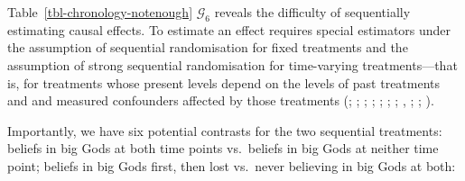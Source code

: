 \documentclass[
  single column]{article}
\begin{document}
Table~\ref{tbl-chronology-notenough} \(\mathcal{G}_6\) reveals the
difficulty of sequentially estimating causal effects. To estimate an
effect requires special estimators under the assumption of sequential
randomisation for fixed treatments and the assumption of strong
sequential randomisation for time-varying treatments---that is, for
treatments whose present levels depend on the levels of past treatments
and and measured confounders affected by those treatments
(;
;
;
;
;
;
;
,
;
;
).

Importantly, we have six potential contrasts for the two sequential
treatments: beliefs in big Gods at both time points vs.~beliefs in big
Gods at neither time point; beliefs in big Gods first, then lost
vs.~never believing in big Gods at both:
\end{document}
